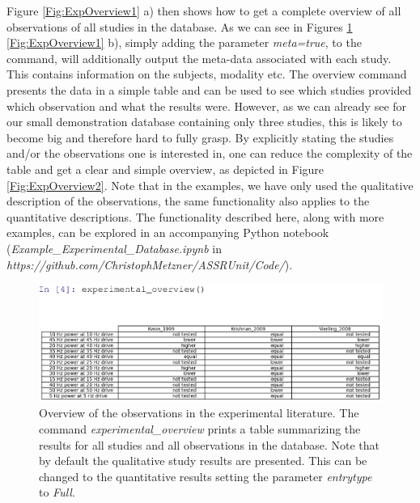 \documentclass[CompPsych]{stjour}
\begin{document}
Figure \ref{Fig:ExpOverview1} a) then shows how to get a complete overview of all observations of all studies in the database. As we can see in Figures \ref{Fig:ExpOverview0} \ref{Fig:ExpOverview1} b), simply adding the parameter \textit{meta=true},
to the command, will additionally output the meta-data associated with each study. This contains information on the subjects, modality etc.
The overview command presents the data in a simple table and can be used to see which studies provided 
which observation and what the results were. However, as we can already see for our small demonstration database containing only three studies, this is likely to become big and therefore hard to fully grasp.
By explicitly stating the studies and/or the observations one is interested in, one can reduce the complexity of the table and get a clear and simple overview, as depicted in Figure \ref{Fig:ExpOverview2}. Note that in the
examples, we have only used the qualitative description of the observations, the same functionality also applies to the quantitative descriptions. The functionality described here, along with
more examples, can be explored in an accompanying Python notebook (\textit{Example\_Experimental\_Database.ipynb} in \textit{https://github.com/ChristophMetzner/ASSRUnit/Code/}).


\begin{figure}
\includegraphics[width=\textwidth]{Figures/full_overview2}
\caption{Overview of the observations in the experimental literature.  The command \textit{experimental\_overview} prints a table summarizing the results for all studies and all observations in the database. 
 Note that by default the qualitative study results are presented. This can be changed to the quantitative results
setting the parameter \textit{entrytype} to \textit{Full}.}
\label{Fig:ExpOverview0}
\end{figure}
\end{document}
